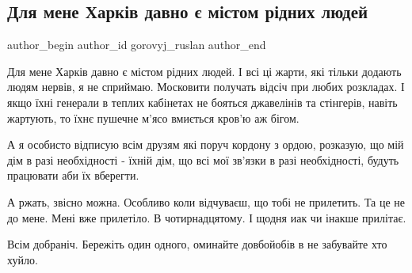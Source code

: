  
 
 
 
 
 
\subsection{Для мене Харків давно є містом рідних людей}
\label{sec:21_01_2022.fb.gorovyj_ruslan.1.harkov}
 
\ifcmt
 author_begin
   author_id gorovyj_ruslan
 author_end
\fi

Для мене Харків давно є містом рідних людей. І всі ці жарти, які тільки додають
людям нервів, я не сприймаю. Московити получать відсіч при любих розкладах. І
якщо їхні генерали в теплих кабінетах не бояться джавелінів та стінгерів,
навіть жартують, то їхнє пушечне м’ясо вмиється кров’ю аж бігом.

А я особисто відписую всім друзям які поруч кордону з ордою, розказую, що мій
дім в разі необхідності - їхній дім, що всі мої зв’язки в разі необхідності,
будуть працювати аби їх вберегти. 

А ржать, звісно можна. Особливо коли відчуваєш, що тобі не прилетить. Та це не
до мене. Мені вже прилетіло. В чотирнадцятому. І щодня иак чи інакше прилітає.

Всім добраніч. Бережіть один одного, оминайте довбойобів в не забувайте хто
хуйло.

